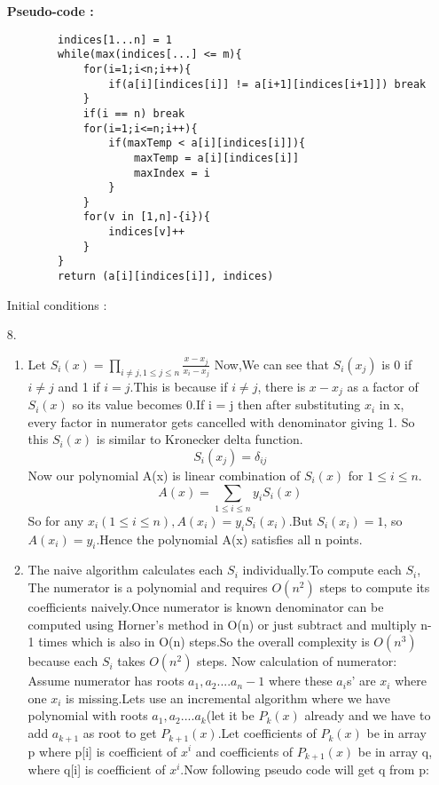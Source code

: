 \documentclass[12pt]{article}
\begin{document}
\begin{enumerate}
    \textbf{Pseudo-code :}
    \begin{verbatim}
        indices[1...n] = 1
        while(max(indices[...] <= m){
            for(i=1;i<n;i++){
                if(a[i][indices[i]] != a[i+1][indices[i+1]]) break
            }
            if(i == n) break
            for(i=1;i<=n;i++){
                if(maxTemp < a[i][indices[i]]){
                    maxTemp = a[i][indices[i]]
                    maxIndex = i
                }
            }
            for(v in [1,n]-{i}){
                indices[v]++
            }
        }
        return (a[i][indices[i]], indices)
    \end{verbatim}
    Initial conditions : 
    \item[8.]
    \begin{enumerate}
        \item Let $S_i(x) = \prod_{i\neq j,1 \leq j \leq n} \frac{x-x_j}{x_i-x_j}$
Now,We can see that $S_i(x_j)$ is 0 if $i \neq j$ and 1 if $i = j$.This is because if $i \neq j$, there is $x-x_j$ as a factor of $S_i(x)$ so its value becomes 0.If i = j then after substituting $x_i$ in x, every factor in numerator gets cancelled with denominator giving 1.
So this $S_i(x)$ is similar to Kronecker delta function.
\begin{equation*}
    S_i(x_j) = \delta_{ij}
\end{equation*}
Now our polynomial A(x) is linear combination of $S_i(x)$ for $1 \leq i \leq n$.
\begin{equation*}
    A(x) = \sum_{1 \leq i \leq n}{y_i S_i(x)}
\end{equation*}
So for any $x_i(1 \leq i \leq n) , A(x_i) = y_i S_i(x_i)$.But $S_i(x_i)=1$, so $A(x_i)=y_i$.Hence
the polynomial A(x) satisfies all n points.
\item
The naive algorithm calculates each $S_i$ individually.To compute each $S_i$, The numerator is a polynomial and requires $O(n^2)$ steps to compute its coefficients naively.Once numerator is known denominator can be computed using Horner's method in O(n) or just subtract and multiply n-1 times which is also in O(n) steps.So the overall complexity is $O(n^3)$ because each $S_i$ takes $O(n^2)$ steps.
Now calculation of numerator:
Assume numerator has roots $a_1,a_2....a_n-1$ where these $a_i$s' are $x_i$ where one $x_i$ is missing.Lets use an incremental algorithm where we have polynomial with roots $a_1,a_2....a_k$(let it be $P_{k}(x)$ already and we have to add $a_{k+1}$ as root to get $P_{k+1}(x)$.Let coefficients of $P_k(x)$ be in array p where p[i] is coefficient of $x^i$ and coefficients of $P_{k+1}(x)$ be in array q, where q[i] is coefficient of $x^i$.Now following pseudo code will get q from p:

\end{enumerate}
\end{enumerate}
\end{document}
